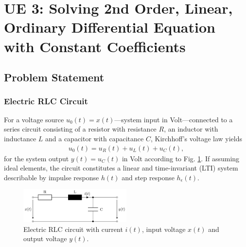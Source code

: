 % 
\clearpage
\section{UE 3: Solving 2nd Order, Linear, Ordinary Differential Equation with
Constant Coefficients}
\subsection{Problem Statement}
\subsubsection{Electric RLC Circuit}
For a voltage source $u_0(t)=x(t)$---system input in Volt---connected to a
series circuit consisting of
a resistor with resistance $R$,
an inductor with inductance $L$ and
a capacitor with capacitance $C$,
Kirchhoff's voltage law yields
\begin{align}
\label{eq:KirchhoffLaw}
u_0(t) = u_R(t) + u_L(t) + u_C(t),
\end{align}
for the system output $y(t) = u_C(t)$ in Volt according to Fig. \ref{fig:lowpass}.
If assuming ideal elements, the circuit constitutes a linear and time-invariant
(LTI) system describable by impulse response $h(t)$ and step response
$h_\epsilon(t)$.
%
\begin{figure}[h]
\centering
\includegraphics[width=0.5\textwidth]{../laplace_transform/lowpass.png}
\caption{Electric RLC circuit with current $i(t)$, input voltage $x(t)$
and output voltage $y(t)$.}
\label{fig:lowpass}
\end{figure}



